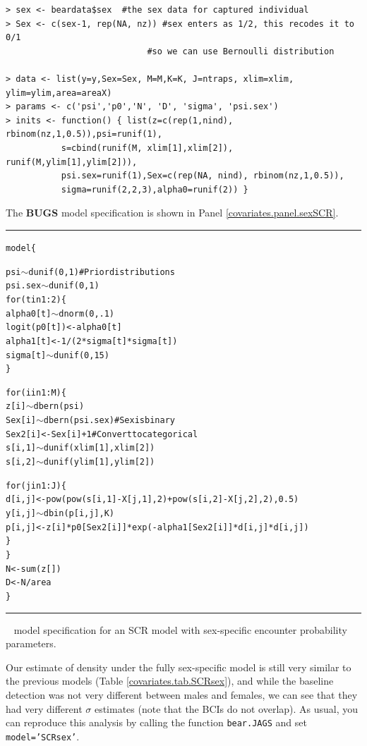 {\small
\begin{verbatim}
> sex <- beardata$sex  #the sex data for captured individual
> Sex <- c(sex-1, rep(NA, nz)) #sex enters as 1/2, this recodes it to 0/1
                            #so we can use Bernoulli distribution 

> data <- list(y=y,Sex=Sex, M=M,K=K, J=ntraps, xlim=xlim, ylim=ylim,area=areaX)
> params <- c('psi','p0','N', 'D', 'sigma', 'psi.sex')
> inits <- function() { list(z=c(rep(1,nind), rbinom(nz,1,0.5)),psi=runif(1), 
           s=cbind(runif(M, xlim[1],xlim[2]), runif(M,ylim[1],ylim[2])),
           psi.sex=runif(1),Sex=c(rep(NA, nind), rbinom(nz,1,0.5)), 
           sigma=runif(2,2,3),alpha0=runif(2)) }
\end{verbatim}
}
{\flushleft The} {\bf BUGS} model specification is shown in Panel 
\ref{covariates.panel.sexSCR}.

 
\begin{panel}[htp]
\centering
\rule[0.1in]{\textwidth}{.03in}
{\small
\begin{alltt}
model\{

psi \(\sim\) dunif(0,1)                            # Prior distributions
psi.sex \(\sim\) dunif(0,1)
for(t in 1:2)\{                             
  alpha0[t] \(\sim\) dnorm(0,.1)
  logit(p0[t]) <- alpha0[t]
  alpha1[t] <- 1/(2*sigma[t]*sigma[t])
  sigma[t] \(\sim\) dunif(0, 15)
\}

for(i in 1:M)\{
  z[i] \(\sim\) dbern(psi)
  Sex[i] \(\sim\) dbern(psi.sex)                    # Sex is binary
  Sex2[i] <- Sex[i] + 1                       # Convert to categorical
  s[i,1] \(\sim\) dunif(xlim[1],xlim[2])
  s[i,2] \(\sim\) dunif(ylim[1],ylim[2])

  for(j in 1:J)\{
    d[i,j] <- pow(pow(s[i,1]-X[j,1],2) + pow(s[i,2]-X[j,2],2),0.5)
    y[i,j] \(\sim\) dbin(p[i,j],K)
    p[i,j] <- z[i]*p0[Sex2[i]]*exp(-alpha1[Sex2[i]]*d[i,j]*d[i,j])
   \}
 \}
N <- sum(z[])
D <- N/area
\}
\end{alltt}
}

\rule[-0.1in]{\textwidth}{.03in}
\caption{
\jags~ model specification for an SCR model with sex-specific 
encounter probability parameters.}
\label{covariates.panel.SCRsex}
\end{panel}

Our estimate of density under the fully sex-specific model is still
very similar to the previous models (Table
\ref{covariates.tab.SCRsex}), and while the baseline detection was not
very different between males and females, we can see that they had
very different $\sigma$ estimates (note that the BCIs do not overlap).
As usual, you can reproduce this analysis by calling the function 
{\tt bear.JAGS} and set {\tt model='SCRsex'}.

